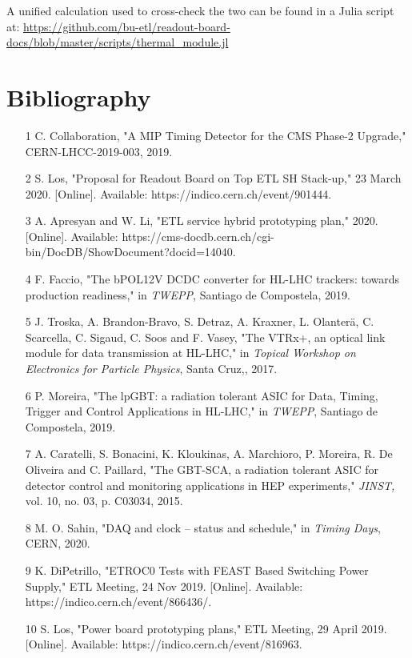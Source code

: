 \documentclass[11pt]{article}
\begin{document}
A unified calculation used to cross-check the two can be found in a Julia script at:
\url{https://github.com/bu-etl/readout-board-docs/blob/master/scripts/thermal_module.jl}

\clearpage

\section{Bibliography}

\begin{itemize}
  \item [1]  C. Collaboration, "A MIP Timing Detector for the CMS Phase-2 Upgrade," CERN-LHCC-2019-003, 2019.
  \item [2]  S. Los, "Proposal for Readout Board on Top ETL SH Stack-up," 23 March 2020. [Online]. Available: https://indico.cern.ch/event/901444.
  \item [3]  A. Apresyan and W. Li, "ETL service hybrid prototyping plan," 2020. [Online]. Available: https://cms-docdb.cern.ch/cgi-bin/DocDB/ShowDocument?docid=14040.
  \item [4]  F. Faccio, "The bPOL12V DCDC converter for HL-LHC trackers: towards production readiness," in \emph{TWEPP}, Santiago de Compostela, 2019.
  \item [5]  J. Troska, A. Brandon-Bravo, S. Detraz, A. Kraxner, L. Olanterä, C. Scarcella, C. Sigaud, C. Soos and F. Vasey, "The VTRx+, an optical link module for data transmission at HL-LHC," in \emph{Topical Workshop on Electronics for Particle Physics}, Santa Cruz,, 2017.
  \item [6]  P. Moreira, "The lpGBT: a radiation tolerant ASIC for Data, Timing, Trigger and Control Applications in HL-LHC," in \emph{TWEPP}, Santiago de Compostela, 2019.
  \item [7]  A. Caratelli, S. Bonacini, K. Kloukinas, A. Marchioro, P. Moreira, R. De Oliveira and C. Paillard, "The GBT-SCA, a radiation tolerant ASIC for detector control and monitoring applications in HEP experiments," \emph{JINST,} vol. 10, no. 03, p. C03034, 2015.
  \item [8]  M. O. Sahin, "DAQ and clock -- status and schedule," in \emph{Timing Days}, CERN, 2020.
  \item [9]  K. DiPetrillo, "ETROC0 Tests with FEAST Based Switching Power Supply," ETL Meeting, 24 Nov 2019. [Online]. Available: https://indico.cern.ch/event/866436/.
  \item [10]  S. Los, "Power board prototyping plans," ETL Meeting, 29 April 2019. [Online]. Available: https://indico.cern.ch/event/816963.

\end{itemize}
\end{document}
